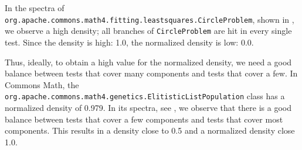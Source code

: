 \documentclass[twoside,a4paper,11pt]{memoir}
\begin{document}
In the spectra of \texttt{org.apache.commons.math4.fitting.least\-squares.Circle\-Problem}, shown in , we observe a high density; all branches of \texttt{Circle\-Problem} are hit in every single test.
Since the density is high: 1.0, the normalized density is low: 0.0.

Thus, ideally, to obtain a high value for the normalized density, we need a good balance between tests that cover many components and tests that cover a few.
In Commons Math, the \texttt{org.apache.commons.math4.genetics.Elitistic\-List\-Population} class has a normalized density of 0.979.
In its spectra, see , we observe that there is a good balance between tests that cover a few components and tests that cover most components.
This results in a density close to 0.5 and a normalized density close 1.0.
\end{document}
